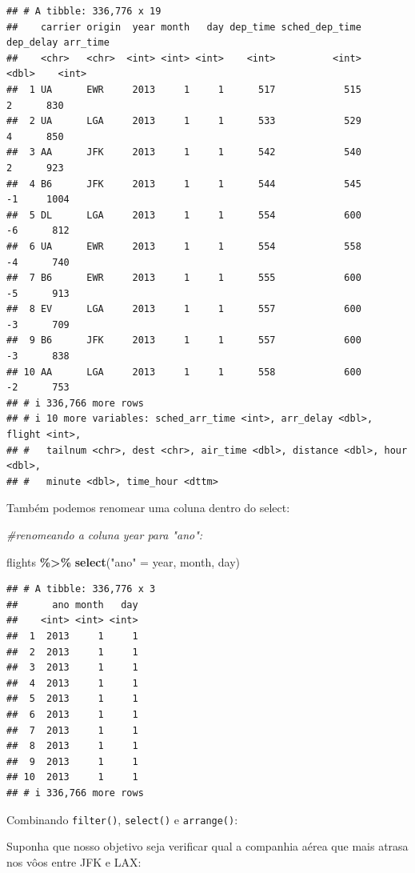 \documentclass[
]{book}
\newenvironment{Shaded}{\begin{snugshade}}{\end{snugshade}}
\newcommand{\CommentTok}[1]{\textcolor[rgb]{0.56,0.35,0.01}{\textit{#1}}}
\newcommand{\FunctionTok}[1]{\textcolor[rgb]{0.13,0.29,0.53}{\textbf{#1}}}
\newcommand{\NormalTok}[1]{#1}
\newcommand{\OtherTok}[1]{\textcolor[rgb]{0.56,0.35,0.01}{#1}}
\newcommand{\SpecialCharTok}[1]{\textcolor[rgb]{0.81,0.36,0.00}{\textbf{#1}}}
\newcommand{\StringTok}[1]{\textcolor[rgb]{0.31,0.60,0.02}{#1}}
\begin{document}
\begin{verbatim}
## # A tibble: 336,776 x 19
##    carrier origin  year month   day dep_time sched_dep_time dep_delay arr_time
##    <chr>   <chr>  <int> <int> <int>    <int>          <int>     <dbl>    <int>
##  1 UA      EWR     2013     1     1      517            515         2      830
##  2 UA      LGA     2013     1     1      533            529         4      850
##  3 AA      JFK     2013     1     1      542            540         2      923
##  4 B6      JFK     2013     1     1      544            545        -1     1004
##  5 DL      LGA     2013     1     1      554            600        -6      812
##  6 UA      EWR     2013     1     1      554            558        -4      740
##  7 B6      EWR     2013     1     1      555            600        -5      913
##  8 EV      LGA     2013     1     1      557            600        -3      709
##  9 B6      JFK     2013     1     1      557            600        -3      838
## 10 AA      LGA     2013     1     1      558            600        -2      753
## # i 336,766 more rows
## # i 10 more variables: sched_arr_time <int>, arr_delay <dbl>, flight <int>,
## #   tailnum <chr>, dest <chr>, air_time <dbl>, distance <dbl>, hour <dbl>,
## #   minute <dbl>, time_hour <dttm>
\end{verbatim}

Também podemos renomear uma coluna dentro do select:

\begin{Shaded}
\begin{Highlighting}[]
\CommentTok{\#renomeando a coluna year para "ano":}

\NormalTok{flights }\SpecialCharTok{\%\textgreater{}\%} \FunctionTok{select}\NormalTok{(}\StringTok{"ano"} \OtherTok{=}\NormalTok{ year, month, day)}
\end{Highlighting}
\end{Shaded}

\begin{verbatim}
## # A tibble: 336,776 x 3
##      ano month   day
##    <int> <int> <int>
##  1  2013     1     1
##  2  2013     1     1
##  3  2013     1     1
##  4  2013     1     1
##  5  2013     1     1
##  6  2013     1     1
##  7  2013     1     1
##  8  2013     1     1
##  9  2013     1     1
## 10  2013     1     1
## # i 336,766 more rows
\end{verbatim}

Combinando \texttt{filter()}, \texttt{select()} e \texttt{arrange()}:

Suponha que nosso objetivo seja verificar qual a companhia aérea que mais atrasa nos vôos entre JFK e LAX:
\end{document}
